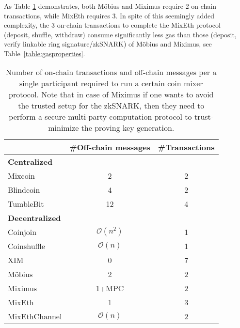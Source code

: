 \documentclass[a4paper]{article}
\theoremstyle{definition}
\begin{document}
As Table \ref{table:communicationcomplexity} demonstrates, both Möbius and Miximus require $2$ on-chain transactions, while MixEth requires $3$. In spite of this seemingly added complexity, the 3 on-chain transactions to complete the MixEth protocol (deposit, shuffle, withdraw) consume significantly less gas than those (deposit, verify linkable ring signature/zkSNARK) of Möbius and Miximus, see Table~\ref{table:gasproperties}. 
\begin{table}[H] 
\caption{Number of on-chain transactions and off-chain messages per a single participant required to run a certain coin mixer protocol. Note that in case of Miximus if one wants to avoid the trusted setup for the zkSNARK, then they need to perform a secure multi-party computation protocol to trust-minimize the proving key generation.}
\centering 
\begin{tabular}{lcc} 
	
	\toprule
	&\#Off-chain messages& \#Transactions \\
	\midrule
	\textbf{Centralized} & & \\
	\midrule
	Mixcoin \cite{bonneau2014mixcoin} & 2      & 2       \\
	Blindcoin \cite{valenta2015blindcoin} & 4      & 2       \\
	TumbleBit \cite{heilman2017tumblebit} & 12      & 4      \\
	\midrule
	\textbf{Decentralized}      &    &      \\
	\midrule
	Coinjoin \cite{maxwell2013coinjoin} &  $\mathcal{O}(n^2)$     & 1       \\
	Coinshuffle \cite{ruffing2014coinshuffle} &$\mathcal{O}(n)$       & 1       \\
	XIM \cite{bissias2014sybil} & 0      & 7       \\
	Möbius \cite{meiklejohn2018mobius} & 2    & 2       \\
	Miximus \cite{miximus2018} & 1+MPC & 2 \\
	MixEth & 1 & 3 \\
	MixEthChannel  & $\mathcal{O}(n)$ &2 \\
	\bottomrule
\end{tabular}
\label{table:communicationcomplexity}
\end{table}
\end{document}
